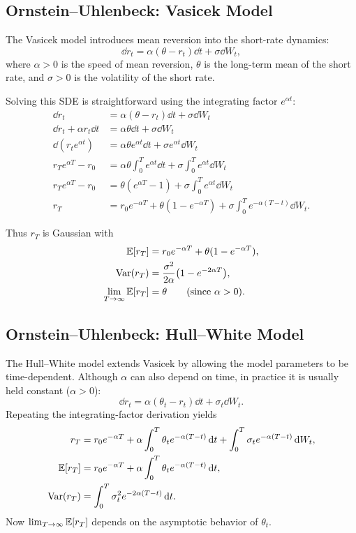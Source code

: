 \subsection*{Ornstein--Uhlenbeck: Vasicek Model}
The Vasicek model introduces mean reversion into the short-rate dynamics:
\[
\dd r_t = \alpha(\theta - r_t)\dd t + \sigma\dd W_t,
\]
where $\alpha > 0$ is the speed of mean reversion, $\theta$ is the long-term mean of the short rate, and $\sigma > 0$ is the volatility of the short rate.

Solving this SDE is straightforward using the integrating factor $e^{\alpha t}$:
\begin{align*}
\dd r_t &= \alpha(\theta - r_t)\dd t + \sigma\dd W_t \\
\dd r_t + \alpha r_t\dd t &= \alpha\theta\dd t + \sigma\dd W_t \\
\dd(r_t e^{\alpha t}) &= \alpha\theta e^{\alpha t}\dd t + \sigma e^{\alpha t}\dd W_t \\
r_T e^{\alpha T} - r_0 &= \alpha\theta \int_0^T e^{\alpha t}\dd t + \sigma \int_0^T e^{\alpha t}\dd W_t \\
r_T e^{\alpha T} - r_0 &= \theta(e^{\alpha T} - 1) + \sigma \int_0^T e^{\alpha t}\dd W_t \\
r_T &= r_0 e^{-\alpha T} + \theta(1 - e^{-\alpha T}) + \sigma \int_0^T e^{-\alpha(T-t)}\dd W_t.
\end{align*}

Thus $r_T$ is Gaussian with
\begin{align*}
\mathbb{E}[r_T] &= r_0 e^{-\alpha T} + \theta(1 - e^{-\alpha T}), \\
\operatorname{Var}(r_T) &= \frac{\sigma^2}{2\alpha}\bigl(1 - e^{-2\alpha T}\bigr), \\
\lim_{T \to \infty} \mathbb{E}[r_T] &= \theta \qquad (\text{since } \alpha > 0).
\end{align*}

\subsection*{Ornstein--Uhlenbeck: Hull--White Model}
The Hull--White model extends Vasicek by allowing the model parameters to be time-dependent. Although $\alpha$ can also depend on time, in practice it is usually held constant ($\alpha > 0$):
\[
\dd r_t = \alpha(\theta_t - r_t)\dd t + \sigma_t\dd W_t.
\]
Repeating the integrating-factor derivation yields
\begin{align*}
r_T &= r_0 e^{-\alpha T} + \alpha \int_0^T \theta_t e^{-\alpha(T-t)}\,\mathrm{d} t + \int_0^T \sigma_t e^{-\alpha(T-t)}\,\mathrm{d} W_t, \\
\mathbb{E}[r_T] &= r_0 e^{-\alpha T} + \alpha \int_0^T \theta_t e^{-\alpha(T-t)}\,\mathrm{d} t, \\
\operatorname{Var}(r_T) &= \int_0^T \sigma_t^2 e^{-2\alpha(T-t)}\,\mathrm{d} t.
\end{align*}
Now $\lim_{T \to \infty} \mathbb{E}[r_T]$ depends on the asymptotic behavior of $\theta_t$.

